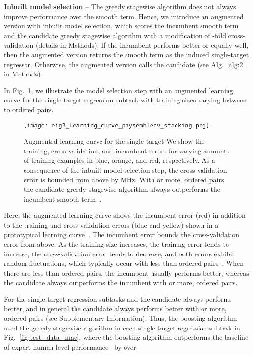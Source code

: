 \documentclass[aps,twocolumn,superscriptaddress,floatfix,preprintnumbers,showkeys]{revtex4}
\begin{document}
\textbf{Inbuilt model selection} -- The greedy stagewise algorithm does not always improve performance over the smooth term. Hence, we introduce an augmented version with inbuilt model selection, which scores the incumbent smooth term and the candidate greedy stagewise algorithm with a modification of -fold cross-validation (details in Methods). If the incumbent performs better or equally well, then the augmented version returns the smooth term as the induced single-target regressor. Otherwise, the augmented version calls the candidate (see Alg.~\ref{alg:2} in Methods).

In Fig.~\ref{fig:eig_learning_curve}, we illustrate the model selection step with an augmented learning curve for the single-target regression subtask  with training sizes varying between  to  ordered pairs.
\begin{figure}
\centering
\texttt{[image: eig3\_learning\_curve\_physemblecv\_stacking.png]}
\caption{Augmented learning curve for the single-target  We show the training, cross-validation, and incumbent errors for varying amounts of training examples in blue, orange, and red, respectively. As a consequence of the inbuilt model selection step, the cross-validation error is bounded from above by  MHz. With  or more, ordered pairs the candidate greedy stagewise algorithm always outperforms the incumbent smooth term~\cite{Roushan_2017, Neill_2018, Chiaro_2019}.}
\label{fig:eig_learning_curve}
\end{figure}
Here, the augmented learning curve shows the incumbent error (red) in addition to the training and cross-validation errors (blue and yellow) shown in a prototypical learning curve~\cite{Hastie_2009, Sklearn_2011, Ng_2020}. The incumbent error bounds the cross-validation error from above. As the training size increases, the training error tends to increase, the cross-validation error tends to decrease, and both errors exhibit random fluctuations, which typically occur with less than  ordered pairs~\cite{Ng_2020}. When there are less than  ordered pairs, the incumbent usually performs better, whereas the candidate always outperforms the incumbent with  or more, ordered pairs. 

For the single-target regression subtasks   and  the candidate always performs better, and in general the candidate always performs better with  or more, ordered pairs (see Supplementary Information). Thus, the boosting algorithm used the greedy stagewise algorithm in each single-target regression subtask in Fig.~\ref{fig:test_data_mae}, where the boosting algorithm outperforms the baseline of expert human-level performance~\cite{Roushan_2017, Neill_2018, Chiaro_2019} by over 
\end{document}
